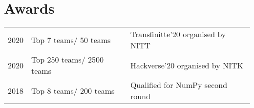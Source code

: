 \documentclass[]{deedy-resume-openfont}
\begin{document}
\begin{minipage}[t]{0.67\textwidth}
\sectionsep






\section{Awards} 
\begin{tabular}{rll}
2020&Top 7 teams/ 50 teams& Transfinitte'20 organised by NITT\\
2020&Top 250 teams/ 2500 teams& Hackverse'20 organised by NITK\\
2018&Top 8 teams/ 200 teams & Qualified for NumPy second round

\end{tabular}
\sectionsep


\end{minipage} 
\end{document}
